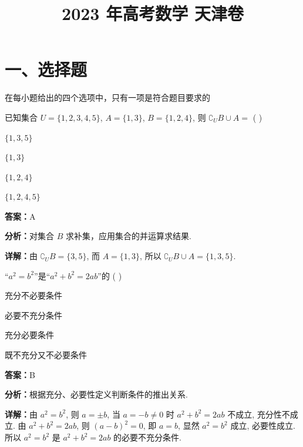 ﻿\title{2023 年高考数学 天津卷}
\date{}
\maketitle

\section*{一、选择题}
在每小题给出的四个选项中，只有一项是符合题目要求的

\begin{question}[points=5]
已知集合 $U = \{1, 2, 3, 4, 5\}$, $A = \{1, 3\}$, $B = \{1, 2, 4\}$, 则 $\complement_U B \cup A =$ ( )
\begin{choices}
  \item $\{1,3,5\}$
  \item $\{1,3\}$
  \item $\{1,2,4\}$
  \item $\{1,2,4,5\}$
\end{choices}
\begin{solution}
\textbf{答案：}A

\textbf{分析：}对集合 $B$ 求补集，应用集合的并运算求结果.

\textbf{详解：}由 $\complement_U B = \{3,5\}$, 而 $A = \{1,3\}$, 所以 $\complement_U B \cup A = \{1,3,5\}$.
\end{solution}
\end{question}

\begin{question}[points=5]
“$a^2 = b^2$”是“$a^2 + b^2 = 2ab$”的 ( )
\begin{choices}
  \item 充分不必要条件
  \item 必要不充分条件
  \item 充分必要条件
  \item 既不充分又不必要条件
\end{choices}
\begin{solution}
\textbf{答案：}B

\textbf{分析：}根据充分、必要性定义判断条件的推出关系.

\textbf{详解：}由 $a^2 = b^2$, 则 $a = \pm b$, 当 $a = -b \neq 0$ 时 $a^2 + b^2 = 2ab$ 不成立, 充分性不成立. 由 $a^2 + b^2 = 2ab$, 则 $(a-b)^2 = 0$, 即 $a = b$, 显然 $a^2 = b^2$ 成立, 必要性成立. 所以 $a^2 = b^2$ 是 $a^2 + b^2 = 2ab$ 的必要不充分条件.
\end{solution}
\end{question}

